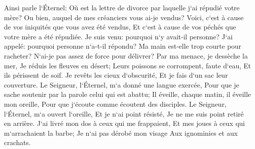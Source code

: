 \verse Ainsi parle l`Éternel: Où est la lettre de divorce par laquelle j`ai répudié votre mère? Ou bien, auquel de mes créanciers vous ai-je vendus? Voici, c`est à cause de vos iniquités que vous avez été vendus, Et c`est à cause de vos péchés que votre mère a été répudiée. 
\verse Je suis venu: pourquoi n`y avait-il personne? J`ai appelé: pourquoi personne n`a-t-il répondu? Ma main est-elle trop courte pour racheter? N`ai-je pas assez de force pour délivrer? Par ma menace, je dessèche la mer, Je réduis les fleuves en désert; Leurs poissons se corrompent, faute d`eau, Et ils périssent de soif. 
\verse Je revêts les cieux d`obscurité, Et je fais d`un sac leur couverture. 
\verse Le Seigneur, l`Éternel, m`a donné une langue exercée, Pour que je sache soutenir par la parole celui qui est abattu; Il éveille, chaque matin, il éveille mon oreille, Pour que j`écoute comme écoutent des disciples. 
\verse Le Seigneur, l`Éternel, m`a ouvert l`oreille, Et je n`ai point résisté, Je ne me suis point retiré en arrière. 
\verse J`ai livré mon dos à ceux qui me frappaient, Et mes joues à ceux qui m`arrachaient la barbe; Je n`ai pas dérobé mon visage Aux ignominies et aux crachats. 
